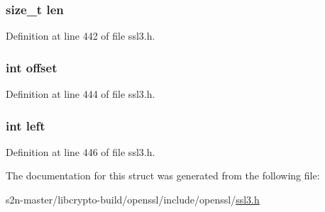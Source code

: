\subsubsection[{\texorpdfstring{len}{len}}]{\setlength{\rightskip}{0pt plus 5cm}size\+\_\+t len}\hypertarget{structssl3__buffer__st_a7360b55975153b822efc5217b7734e6a}{}\label{structssl3__buffer__st_a7360b55975153b822efc5217b7734e6a}


Definition at line 442 of file ssl3.\+h.

\subsubsection[{\texorpdfstring{offset}{offset}}]{\setlength{\rightskip}{0pt plus 5cm}int offset}\hypertarget{structssl3__buffer__st_aed7ea92f45bd273dde380a45ddced592}{}\label{structssl3__buffer__st_aed7ea92f45bd273dde380a45ddced592}


Definition at line 444 of file ssl3.\+h.

\subsubsection[{\texorpdfstring{left}{left}}]{\setlength{\rightskip}{0pt plus 5cm}int left}\hypertarget{structssl3__buffer__st_ad8f5e19e19f12974c9713e920ec54331}{}\label{structssl3__buffer__st_ad8f5e19e19f12974c9713e920ec54331}


Definition at line 446 of file ssl3.\+h.



The documentation for this struct was generated from the following file\+:\begin{DoxyCompactItemize}
\item 
s2n-\/master/libcrypto-\/build/openssl/include/openssl/\hyperlink{include_2openssl_2ssl3_8h}{ssl3.\+h}\end{DoxyCompactItemize}
